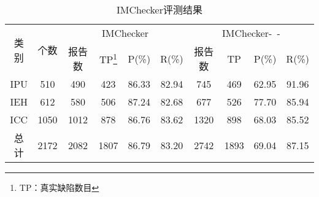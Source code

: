 \begin{table}[b]
	\centering
	\begin{minipage}[t]{0.9\linewidth} %
		\caption{IMChecker评测结果}
		\label{tab:3-4-imchecker}
		\begin{tabular}{cccccccccc}
			\hline
			\multirow{2}{*}{类别 } & \multirow{2}{*}{个数} & \multicolumn{4}{c}{IMChecker} & \multicolumn{4}{c}{IMChecker-~-} \\
			\cline{3-10}
			 & & 报告数 & TP\footnote{TP：真实缺陷数目} & P(\%) & R(\%) & 报告数 & TP& P(\%) & R(\%) \\
			 \hline
			 IPU & 510 & 490 & 423 & 86.33 & 82.94 & 745 & 469 & 62.95 & 91.96 \\
			 IEH & 612 & 580 & 506 & 87.24 & 82.68 & 677 & 526 & 77.70 & 85.94 \\
			 ICC & 1050 & 1012 & 878 & 86.76 & 83.62 & 1320 & 898 & 68.03 & 85.52 \\
			 总计 & 2172 &  2082 & 1807 & 86.79 & 83.20 & 2742 & 1893 & 69.04 & 87.15 \\
			\hline
		\end{tabular}
	\end{minipage}
\end{table}